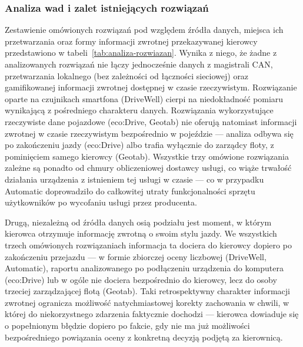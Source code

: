 \subsubsection{Analiza wad i zalet istniejących rozwiązań}

Zestawienie omówionych rozwiązań pod względem źródła danych, miejsca ich przetwarzania
oraz formy informacji zwrotnej przekazywanej kierowcy przedstawiono w
tabeli~\ref{tab:analiza-rozwiazan}. Wynika z niego, że żadne z analizowanych rozwiązań
nie łączy jednocześnie danych z magistrali CAN, przetwarzania lokalnego (bez zależności
od łączności sieciowej) oraz gamifikowanej informacji zwrotnej dostępnej w czasie
rzeczywistym. Rozwiązanie oparte na czujnikach smartfona (DriveWell) cierpi na
niedokładność pomiaru wynikającą z pośredniego charakteru danych. Rozwiązania
wykorzystujące rzeczywiste dane pojazdowe (eco:Drive, Geotab) nie oferują natomiast
informacji zwrotnej w czasie rzeczywistym bezpośrednio w pojeździe --- analiza odbywa
się po zakończeniu jazdy (eco:Drive) albo trafia wyłącznie do zarządcy floty, z pominięciem
samego kierowcy (Geotab). Wszystkie trzy omówione rozwiązania zależne są ponadto od
chmury obliczeniowej dostawcy usługi, co wiąże trwałość działania urządzenia
z istnieniem tej usługi w czasie --- co w przypadku Automatic doprowadziło do
całkowitej utraty funkcjonalności sprzętu użytkowników po wycofaniu usługi przez
producenta.

Drugą, niezależną od źródła danych osią podziału jest moment, w którym kierowca
otrzymuje informację zwrotną o swoim stylu jazdy. We wszystkich trzech omówionych
rozwiązaniach informacja ta dociera do kierowcy dopiero po zakończeniu przejazdu ---
w formie zbiorczej oceny liczbowej (DriveWell, Automatic), raportu analizowanego po
podłączeniu urządzenia do komputera (eco:Drive) lub w ogóle nie dociera bezpośrednio
do kierowcy, lecz do osoby trzeciej zarządzającej flotą (Geotab). Taki retrospektywny
charakter informacji zwrotnej ogranicza możliwość natychmiastowej korekty zachowania
w chwili, w której do niekorzystnego zdarzenia faktycznie dochodzi --- kierowca
dowiaduje się o popełnionym błędzie dopiero po fakcie, gdy nie ma już możliwości
bezpośredniego powiązania oceny z konkretną decyzją podjętą za kierownicą.

